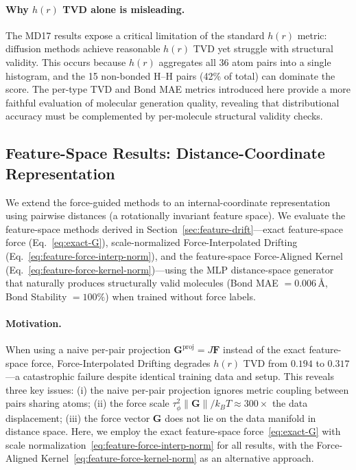\documentclass[11pt]{article}
\newcommand{\bF}{\mathbf{F}}
\newcommand{\bG}{\mathbf{G}}
\newcommand{\kBT}{k_BT}
\begin{document}
\paragraph{Why $h(r)$ TVD alone is misleading.}
The MD17 results expose a critical limitation of the standard $h(r)$ metric: diffusion methods achieve reasonable $h(r)$ TVD yet struggle with structural validity.
This occurs because $h(r)$ aggregates all 36 atom pairs into a single histogram, and the 15 non-bonded H--H pairs (42\% of total) can dominate the score.
The per-type TVD and Bond MAE metrics introduced here provide a more faithful evaluation of molecular generation quality, revealing that distributional accuracy must be complemented by per-molecule structural validity checks.

\subsection{Feature-Space Results: Distance-Coordinate Representation}
\label{sec:feature-space-results}

We extend the force-guided methods to an internal-coordinate representation using pairwise distances (a rotationally invariant feature space).
We evaluate the feature-space methods derived in Section~\ref{sec:feature-drift}---exact feature-space force (Eq.~\ref{eq:exact-G}), scale-normalized Force-Interpolated Drifting (Eq.~\ref{eq:feature-force-interp-norm}), and the feature-space Force-Aligned Kernel (Eq.~\ref{eq:feature-force-kernel-norm})---using the MLP distance-space generator that naturally produces structurally valid molecules (Bond MAE $= 0.006$\,\AA, Bond Stability $= 100\%$) when trained without force labels.

\paragraph{Motivation.}
When using a naive per-pair projection $\bG^{\text{proj}} = J\bF$ instead of the exact feature-space force, Force-Interpolated Drifting degrades $h(r)$ TVD from $0.194$ to $0.317$---a catastrophic failure despite identical training data and setup.
This reveals three key issues:
(i) the naive per-pair projection ignores metric coupling between pairs sharing atoms;
(ii) the force scale $\tau_\phi^2\|\bG\|/\kBT \approx 300\times$ the data displacement;
(iii) the force vector $\bG$ does not lie on the data manifold in distance space.
Here, we employ the exact feature-space force~\eqref{eq:exact-G} with scale normalization~\eqref{eq:feature-force-interp-norm} for all results, with the Force-Aligned Kernel~\eqref{eq:feature-force-kernel-norm} as an alternative approach.
\end{document}
